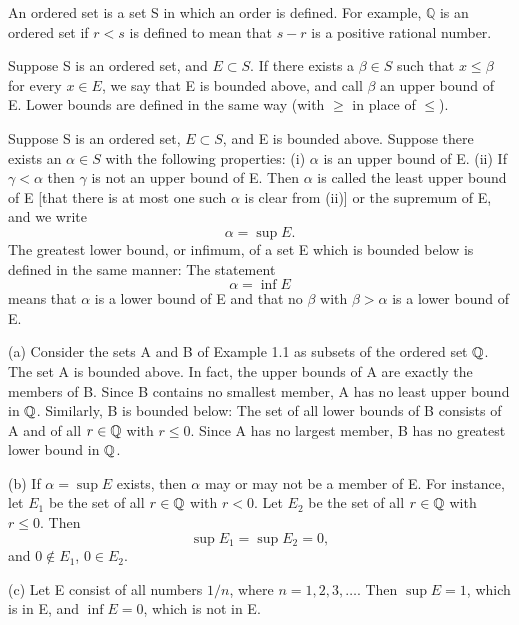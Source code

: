 \begin{definition} %
  \label{def:chap1:ordered_set}
  An ordered set is a set S in which an order is defined. For
  example, $\mathbb{Q}$ is an ordered set if $r<s$ is defined to mean
  that $s-r$ is a positive rational number.
\end{definition}

\begin{definition}[Bounds] %
  \label{def:chap1:bounds}
  Suppose S is an ordered set, and $E \subset S$. If there exists a
  $\beta \in S$ such that $x \le \beta$ for every $x \in E$, we say
  that E is bounded above, and call $\beta$ an upper bound of E.
  Lower bounds are defined in the same way (with $\ge$ in place of $\le$).
\end{definition}

\begin{definition} %
  \label{def:chap1:supremum_infimum}
  Suppose S is an ordered set, $E \subset S$, and E is bounded above.
  Suppose there exists an $\alpha \in S$ with the following properties:
  (i) $\alpha$ is an upper bound of E.
  (ii) If $\gamma < \alpha$ then $\gamma$ is not an upper bound of E.
  Then $\alpha$ is called the least upper bound of E [that there is
  at most one such $\alpha$ is clear from (ii)] or the supremum of E,
  and we write
  \[ \alpha = \sup E. \]
  The greatest lower bound, or infimum, of a set E which is bounded
  below is defined in the same manner: The statement
  \[ \alpha = \inf E \]
  means that $\alpha$ is a lower bound of E and that no $\beta$ with
  $\beta > \alpha$ is a lower bound of E.
\end{definition}



\begin{example} %
  \label{ex:chap1:sup_inf_examples}
  (a) Consider the sets A and B of Example 1.1 as subsets of the
  ordered set $\mathbb{Q}$. The set A is bounded above. In fact, the upper
  bounds of A are exactly the members of B. Since B contains no
  smallest member, A has no least upper bound in $\mathbb{Q}$.
  Similarly, B is bounded below: The set of all lower bounds of B
  consists of A and of all $r \in \mathbb{Q}$ with $r \le 0$. Since A has no
  largest member, B has no greatest lower bound in $\mathbb{Q}$.

  (b) If $\alpha = \sup E$ exists, then $\alpha$ may or may not be a
  member of E. For instance, let $E_1$ be the set of all $r \in \mathbb{Q}$
  with $r < 0$. Let $E_2$ be the set of all $r \in \mathbb{Q}$ with $r \le 0$. Then
  \[ \sup E_1 = \sup E_2 = 0, \]
  and $0 \notin E_1$, $0 \in E_2$.

  (c) Let E consist of all numbers $1/n$, where $n = 1, 2, 3, \dots$.
  Then $\sup E = 1$, which is in E, and $\inf E = 0$, which is not in E.
\end{example}

